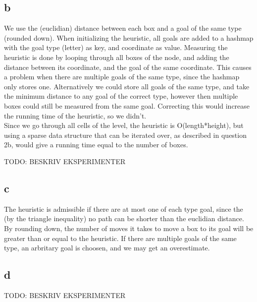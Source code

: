 \documentclass{article}
\begin{document}
\subsection{b}
We use the (euclidian) distance between each box and a goal of the same type (rounded down). When initializing the heuristic, all goals are added to a hashmap with the goal type (letter) as key, and coordinate as value. Measuring the heuristic is done by looping through all boxes of the node, and adding the distance between its
coordinate, and the goal of the same coordinate. This causes a problem when there are multiple goals of the same type, since the hashmap only stores one. Alternatively we could store all goals of the same type, and take the minimum distance to any goal of the correct type, however then multiple boxes could still be measured from the same goal. Correcting this would increase the running time of the heuristic, so we didn't.\\

Since we go through all cells of the level, the heuristic is O(length*height), but using a sparse data structure that can be iterated over, as described in question 2b, would give a running time equal to the number of boxes.

TODO: BESKRIV EKSPERIMENTER

\subsection{c}
The heuristic is admissible if there are at most one of each type goal, since the (by the triangle inequality) no path can be shorter than the euclidian distance. By rounding down, the number of moves it takes to move
a box to its goal will be greater than or equal to the heuristic. If there are multiple goals of the same type, an arbritary goal is choosen, and we may get an overestimate.

\subsection{d}
TODO: BESKRIV EKSPERIMENTER
\end{document}
